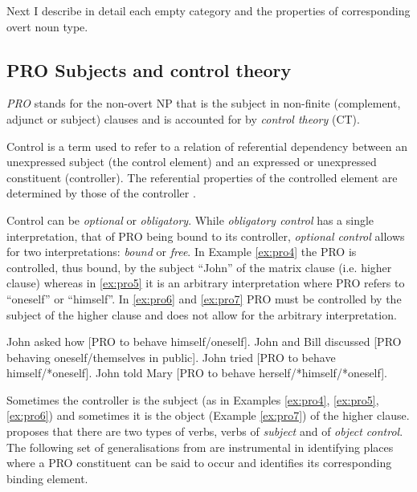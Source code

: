     Next I describe in detail each empty category and the properties of corresponding overt noun type. 


\subsection{PRO Subjects and control theory}
\label{sec:pro-mcg}

    \textit{PRO} stands for the non-overt NP that is the subject in non-finite (complement, adjunct or subject) clauses and is accounted for by \textit{control theory} (CT).

    \begin{definition}[Control]\label{def:control}
    	Control is a term used to refer to a relation of referential dependency between an unexpressed subject (the control element) and an expressed or unexpressed constituent (controller). The referential properties of the controlled element are determined by those of the controller \citep{Bresnan1982}.
    \end{definition}

    Control can be \textit{optional} or \textit{obligatory}. While \textit{obligatory control} has a single interpretation, that of PRO being bound to its controller, \textit{optional control} allows for two interpretations: \textit{bound} or \textit{free}. In Example \ref{ex:pro4} the PRO is controlled, thus bound, by the subject ``John'' of the matrix clause (i.e. higher clause) whereas in \ref{ex:pro5} it is an arbitrary interpretation where PRO refers to ``oneself'' or ``himself''. In \ref{ex:pro6} and \ref{ex:pro7} PRO must be controlled by the subject of the higher clause and does not allow for the arbitrary interpretation.

    \begin{exe}
    	\ex\label{ex:pro4}John asked how [PRO to behave himself/oneself].
    	\ex\label{ex:pro5}John and Bill discussed [PRO behaving oneself/themselves in public].
    	\ex\label{ex:pro6}John tried [PRO to behave himself/*oneself].
    	\ex\label{ex:pro7}John told Mary [PRO to behave herself/*himself/*oneself].
    \end{exe}

    Sometimes the controller is the subject (as in Examples \ref{ex:pro4}, \ref{ex:pro5}, \ref{ex:pro6}) and sometimes it is the object (Example \ref{ex:pro7}) of the higher clause. \citet[278]{Haegeman1991} proposes that there are two types of verbs, verbs of \textit{subject} and of \textit{object control}. The following set of generalisations from \cite{Haegeman1991} are instrumental in identifying places where a PRO constituent can be said to occur and identifies its corresponding binding element.

